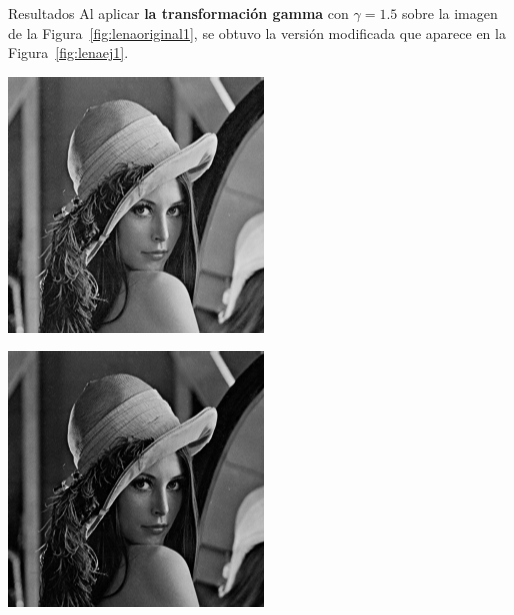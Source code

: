 \documentclass{beamer}
\begin{document}
\begin{frame}[fragile]{Resultados}
	\justifying
	Al aplicar \textcolor{unahurverde}{\textbf{la transformación gamma}} con $\gamma = 1.5$ sobre la imagen de la Figura~\ref{fig:lenaoriginal1}, 
	se obtuvo la versión modificada que aparece en la Figura~\ref{fig:lenaej1}.
	\vspace{0.5cm}
	
	\centering
	\begin{minipage}{0.45\linewidth}
		\centering
		\includegraphics[width=\linewidth]{../results/lena_original}
		\label{fig:lenaoriginal1}
	\end{minipage}\hfill
	\begin{minipage}{0.45\linewidth}
		\centering
		\includegraphics[width=\linewidth]{../results/lena_ej1}

\end{minipage}
\end{frame}
\end{document}
